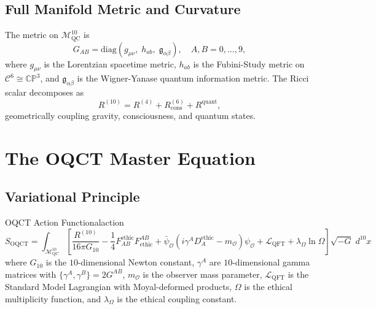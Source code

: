 \documentclass[12pt,a4paper]{article}
\theoremstyle{myrmk}
\newcommand{\Mmanifold}{\mathcal{M}^{10}_{\mathrm{QC}}}
\newcommand{\cC}{\mathcal{C}^{6}}
\begin{document}
\subsection{Full Manifold Metric and Curvature}

The metric on $\Mmanifold$ is
\begin{equation}
  G_{AB} = \mathrm{diag}\!\left(g_{\mu\nu},\; h_{ab},\; \mathfrak{g}_{\alpha\beta}\right),
  \quad A,B = 0,\ldots,9,
  \label{eq:full_metric}
\end{equation}
where $g_{\mu\nu}$ is the Lorentzian spacetime metric, $h_{ab}$ is the Fubini-Study
metric on $\cC\cong\mathbb{CP}^3$, and $\mathfrak{g}_{\alpha\beta}$ is the
Wigner-Yanase quantum information metric. The Ricci scalar decomposes as
\begin{equation}
  R^{(10)} = R^{(4)} + R^{(6)}_{\mathrm{cons}} + R^{\mathrm{quant}},
  \label{eq:ricci_decomp}
\end{equation}
geometrically coupling gravity, consciousness, and quantum states.

\section{The OQCT Master Equation}
\label{sec:oqct_eq}

\subsection{Variational Principle}

\begin{definition}{OQCT Action Functional}{action}
\begin{equation}
  \boxed{
  S_{\mathrm{OQCT}} = \int_{\Mmanifold}
    \left[\frac{R^{(10)}}{16\pi G_{10}}
    - \frac{1}{4}F^{\mathrm{ethic}}_{AB}F^{AB}_{\mathrm{ethic}}
    + \bar{\psi}_{\mathcal{O}}\left(i\gamma^A D^\mathrm{ethic}_A - m_{\mathcal{O}}\right)\psi_{\mathcal{O}}
    + \mathcal{L}_{\mathrm{QFT}} + \lambda_\Omega\ln\Omega\right]
    \sqrt{-G}\;d^{10}x}
  \label{eq:oqct_action}
\end{equation}
where $G_{10}$ is the $10$-dimensional Newton constant, $\gamma^A$ are $10$-dimensional
gamma matrices with $\{\gamma^A,\gamma^B\}=2G^{AB}$, $m_{\mathcal{O}}$ is the observer
mass parameter, $\mathcal{L}_{\mathrm{QFT}}$ is the Standard Model Lagrangian with
Moyal-deformed products, $\Omega$ is the ethical multiplicity function, and
$\lambda_\Omega$ is the ethical coupling constant.
\end{definition}
\end{document}
